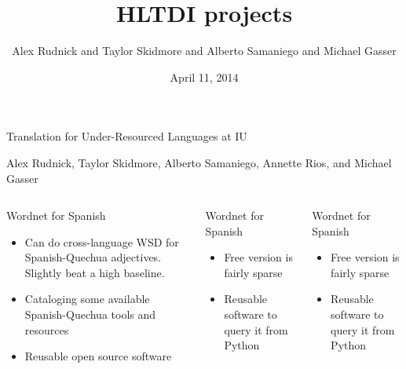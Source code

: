 \documentclass[final]{beamer}
\title{HLTDI projects}
\author{Alex Rudnick and Taylor Skidmore and Alberto Samaniego and Michael Gasser}
\institute[Indiana University]{School of Informatics and Computing, Indiana University}
\date{April 11, 2014}
\begin{document}
\begin{frame}{} 
  \begin{block}
    {\centering \veryHuge Translation for Under-Resourced Languages at IU}\par
    \centering
    {\large Alex Rudnick, Taylor Skidmore, Alberto Samaniego, Annette Rios, and Michael Gasser}
    \par
  \end{block}

\begin{columns}[t]

  \begin{column}{.33\linewidth}

  \vfill
  \begin{block}{\large Wordnet for Spanish}
    \centering
    \begin{itemize}
    \item Can do cross-language WSD for Spanish-Quechua adjectives. Slightly
    beat a high baseline.
    \item Cataloging some available Spanish-Quechua tools and resources
    \item Reusable open source software
    \end{itemize}
  \end{block}

  \end{column}

  \begin{column}{.33\linewidth}
  \vfill
  \begin{block}{\large Wordnet for Spanish}
    \begin{itemize}
    \item Free version is fairly sparse
    \item Reusable software to query it from Python
    \end{itemize}
  \end{block}
  \end{column}


  \begin{column}{.33\linewidth}
  \vfill
  \begin{block}{\large Wordnet for Spanish}
    \begin{itemize}
    \item Free version is fairly sparse
    \item Reusable software to query it from Python
    \end{itemize}
  \end{block}
  \end{column}

\end{columns}

\end{frame}
\end{document}
